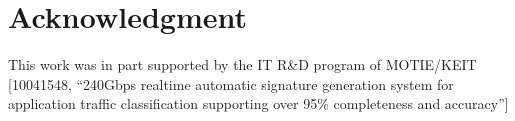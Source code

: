 \documentclass[conference]{IEEEtran}
\begin{document}
\section*{Acknowledgment}
This work was in part supported by the IT R\&D program of MOTIE/KEIT
[10041548,
``240Gbps realtime automatic signature generation
system for application traffic classification supporting over 95\%
completeness and accuracy'']







%






\end{document}
